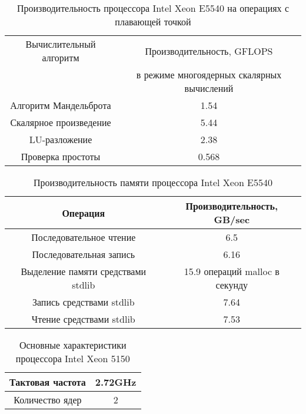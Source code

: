 \begin{table}[ht]
\begin{center}
\caption{Производительность процессора Intel Xeon  E5540 на операциях с плавающей точкой}
\begin{tabular}{|c|c|}
\hline	
Вычислительный алгоритм &  Производительность, GFLOPS \\ 
                 & в режиме многоядерных скалярных вычислений \\ \hline
Алгоритм Мандельброта  &  1.54 	\\ \hline
Скалярное произведение &  5.44   \\ \hline
LU-разложение          &  2.38   \\ \hline
Проверка простоты      & 0.568  \\ \hline 


		\end{tabular}
	\end{center} 	
\end{table} 	

\begin{table}[ht]
	\begin{center}
		\caption{Производительность памяти процессора Intel Xeon  E5540}
		\begin{tabular}{|c|c|}
			\hline	
			Операция  &  Производительность, GB/sec \\ \hline
			Последовательное чтение &  6.5 	\\  \hline
			Последовательная запись &  6.16   \\  \hline
			Выделение памяти средствами stdlib &  15.9 операций malloc в секунду  \\  \hline
			Запись средствами stdlib  & 7.64  \\ \hline
			Чтение средствами stdlib  & 7.53  \\ \hline 
		\end{tabular}
	\end{center} 	
\end{table} 	





\begin{table}[ht]
	\begin{center}
		\caption{Основные характеристики процессора Intel Xeon  5150}
		\begin{tabular}{|c|c|}
			\hline	
			Тактовая частота & 2.72GHz   \\ \hline
			Количество ядер & 2 	     \\ \hline
		\end{tabular}
	\end{center} 	
\end{table} 	

